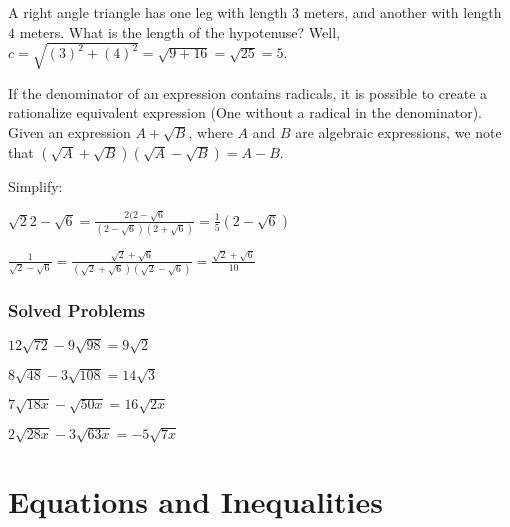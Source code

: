 \documentclass[crop=false,class=book,oneside]{standalone}
\begin{document}
        \begin{example}
        A right angle triangle has one leg with length $3$ meters, and another with length $4$ meters. What is the length of the hypotenuse? Well, $c = \sqrt{(3)^2+(4)^2} = \sqrt{9+16} = \sqrt{25} = 5$.
        \end{example}
        \begin{remark}
        If the denominator of an expression contains radicals, it is possible to create a rationalize equivalent expression (One without a radical in the denominator). Given an expression $A+\sqrt{B}$, where $A$ and $B$ are algebraic expressions, we note that $(\sqrt{A}+\sqrt{B})(\sqrt{A}-\sqrt{B}) = A-B$. 
        \end{remark}
        \begin{example}
        Simplify:
        \begin{enumerate}
        \begin{multicols}{2}
        \item $\sqrt{2}{2-\sqrt{6}} = \frac{2(2-\sqrt{6}}{(2-\sqrt{6})(2+\sqrt{6})} = \frac{1}{5}(2-\sqrt{6})$
        \item $\frac{1}{\sqrt{2}-\sqrt{6}} = \frac{\sqrt{2}+\sqrt{6}}{(\sqrt{2}+\sqrt{6})(\sqrt{2}-\sqrt{6})} = \frac{\sqrt{2}+\sqrt{6}}{10}$
        \end{multicols}
        \end{enumerate}
        \end{example}
        \subsubsection{Solved Problems}
        \begin{enumerate}
        \begin{multicols}{4}
        \item $12\sqrt{72} - 9\sqrt{98} = 9\sqrt{2}$
        \item $8\sqrt{48} - 3\sqrt{108} = 14\sqrt{3}$
        \item $7\sqrt{18x} - \sqrt{50x} = 16\sqrt{2x}$
        \item $2\sqrt{28x} - 3\sqrt{63x} = -5\sqrt{7x}$
        \end{multicols}
        \end{enumerate}
    \section{Equations and Inequalities}
\end{document}
